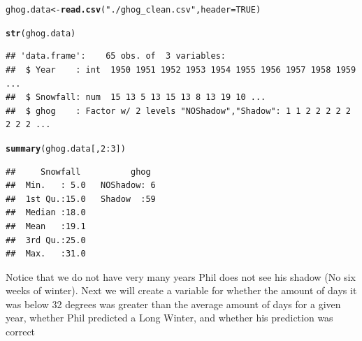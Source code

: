 \documentclass[12pt]{article}\usepackage[]{graphicx}\usepackage[]{color}
\makeatletter
\newcommand{\hlnum}[1]{\textcolor[rgb]{0.686,0.059,0.569}{#1}}%
\newcommand{\hlstr}[1]{\textcolor[rgb]{0.192,0.494,0.8}{#1}}%
\newcommand{\hlopt}[1]{\textcolor[rgb]{0,0,0}{#1}}%
\newcommand{\hlstd}[1]{\textcolor[rgb]{0.345,0.345,0.345}{#1}}%
\newcommand{\hlkwb}[1]{\textcolor[rgb]{0.69,0.353,0.396}{#1}}%
\newcommand{\hlkwc}[1]{\textcolor[rgb]{0.333,0.667,0.333}{#1}}%
\newcommand{\hlkwd}[1]{\textcolor[rgb]{0.737,0.353,0.396}{\textbf{#1}}}%
\newenvironment{kframe}{%
 \def\at@end@of@kframe{}%
 \ifinner\ifhmode%
  \def\at@end@of@kframe{\end{minipage}}%
  \begin{minipage}{\columnwidth}%
 \fi\fi%
 \def\FrameCommand##1{\hskip\@totalleftmargin \hskip-\fboxsep
 \colorbox{shadecolor}{##1}\hskip-\fboxsep
     \hskip-\linewidth \hskip-\@totalleftmargin \hskip\columnwidth}%
 \MakeFramed {\advance\hsize-\width
   \@totalleftmargin\z@ \linewidth\hsize
   \@setminipage}}%
 {\par\unskip\endMakeFramed%
 \at@end@of@kframe}
\newenvironment{knitrout}{}{} %
\makeatother
\begin{document}
\begin{knitrout}
\color{fgcolor}\begin{kframe}
\begin{alltt}
\hlstd{ghog.data}\hlkwb{<-}\hlkwd{read.csv}\hlstd{(}\hlstr{"./ghog_clean.csv"}\hlstd{,}\hlkwc{header}\hlstd{=}\hlnum{TRUE}\hlstd{)}

\hlkwd{str}\hlstd{(ghog.data)}
\end{alltt}
\begin{verbatim}
## 'data.frame':	65 obs. of  3 variables:
##  $ Year    : int  1950 1951 1952 1953 1954 1955 1956 1957 1958 1959 ...
##  $ Snowfall: num  15 13 5 13 15 13 8 13 19 10 ...
##  $ ghog    : Factor w/ 2 levels "NOShadow","Shadow": 1 1 2 2 2 2 2 2 2 2 ...
\end{verbatim}
\begin{alltt}
\hlkwd{summary}\hlstd{(ghog.data[,}\hlnum{2}\hlopt{:}\hlnum{3}\hlstd{])}
\end{alltt}
\begin{verbatim}
##     Snowfall          ghog   
##  Min.   : 5.0   NOShadow: 6  
##  1st Qu.:15.0   Shadow  :59  
##  Median :18.0                
##  Mean   :19.1                
##  3rd Qu.:25.0                
##  Max.   :31.0
\end{verbatim}
\end{kframe}
\end{knitrout}
 
 Notice that we do not have very many years Phil does not see his shadow (No six weeks of winter). Next we will create a variable for whether the amount of days it was below 32 degrees was greater than the average amount of days for a given year, whether Phil predicted a Long Winter, and whether his prediction was correct
 
\end{document}
